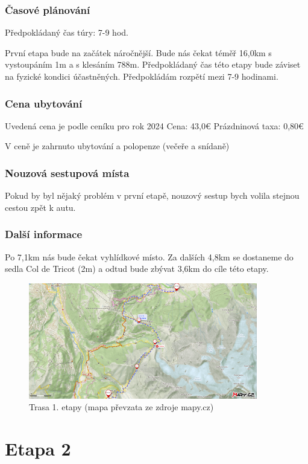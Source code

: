 \subsubsection*{Časové plánování}
\noindent Předpokládaný čas túry: 7-9 hod.

První etapa bude na začátek náročnější. Bude nás čekat téměř 16,0\:km s vystoupáním 1\:m a s klesáním 788\:m. Předpokládaný čas této etapy bude záviset na fyzické kondici účastněných. Předpokládám rozpětí mezi 7-9 hodinami.
\subsubsection*{Cena ubytování}
\noindent Uvedená cena je podle ceníku pro rok 2024
\noindent Cena: 43,0\:€ 
\noindent Prázdninová taxa: 0,80\:€

V ceně je zahrnuto ubytování a polopenze (večeře a snídaně)
\subsubsection*{Nouzová sestupová místa}
Pokud by byl nějaký problém v první etapě, nouzový sestup bych volila stejnou cestou zpět k autu.
\subsubsection*{Další informace}
Po 7,1\:km nás bude čekat vyhlídkové místo. Za dalších 4,8\:km se dostaneme do sedla Col de Tricot (2\:m) a odtud bude zbývat 3,6\:km do cíle této etapy.
\begin{figure}[!hbt]
    \centering
    \includegraphics[width=10.0cm]{Figures/day_1.png}
    \caption[Trasa: den první]{Trasa 1. etapy (mapa převzata ze zdroje mapy.cz)}
    \label{Obr:day_1}
\end{figure} 
\section{Etapa 2}
